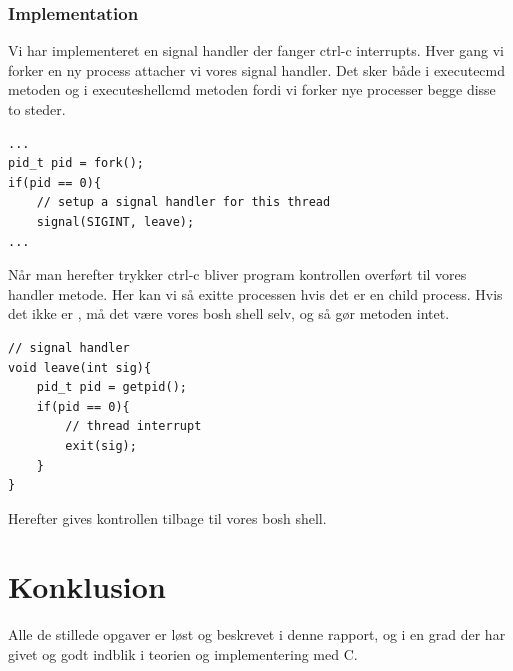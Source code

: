 \documentclass[danish]{report}
\begin{document}
\subsection{Implementation}
Vi har implementeret en signal handler der fanger ctrl-c interrupts. Hver gang vi forker en ny process attacher vi vores signal handler. Det sker både i executecmd metoden og i executeshellcmd metoden fordi vi forker nye processer begge disse to steder. 

\begin{lstlisting}
...
pid_t pid = fork();
if(pid == 0){
	// setup a signal handler for this thread
	signal(SIGINT, leave);
...
\end{lstlisting}

Når man herefter trykker ctrl-c bliver program kontrollen overført til vores handler metode. Her kan vi så exitte processen hvis det er en child process. Hvis det ikke er , må det være vores bosh shell selv, og så gør metoden intet. 

\begin{lstlisting}
// signal handler
void leave(int sig){
	pid_t pid = getpid();
	if(pid == 0){
		// thread interrupt
		exit(sig);
	}
}
\end{lstlisting}

Herefter gives kontrollen tilbage til vores bosh shell.

\chapter{Konklusion}

Alle de stillede opgaver er løst og beskrevet i denne rapport, og i en grad der har givet og godt indblik i teorien og implementering med C.
\end{document}
